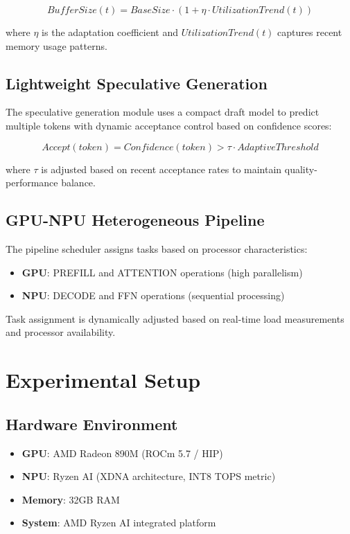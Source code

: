 \documentclass[twocolumn,10pt]{article}
\begin{document}
\begin{equation}
BufferSize(t) = BaseSize \cdot (1 + \eta \cdot UtilizationTrend(t))
\end{equation}

where $\eta$ is the adaptation coefficient and $UtilizationTrend(t)$ captures recent memory usage patterns.

\subsection{Lightweight Speculative Generation}

The speculative generation module uses a compact draft model to predict multiple tokens with dynamic acceptance control based on confidence scores:

\begin{equation}
Accept(token) = Confidence(token) > \tau \cdot AdaptiveThreshold
\end{equation}

where $\tau$ is adjusted based on recent acceptance rates to maintain quality-performance balance.

\subsection{GPU-NPU Heterogeneous Pipeline}

The pipeline scheduler assigns tasks based on processor characteristics:
\begin{itemize}
\item \textbf{GPU}: PREFILL and ATTENTION operations (high parallelism)
\item \textbf{NPU}: DECODE and FFN operations (sequential processing)
\end{itemize}

Task assignment is dynamically adjusted based on real-time load measurements and processor availability.

\section{Experimental Setup}

\subsection{Hardware Environment}
\begin{itemize}
\item \textbf{GPU}: AMD Radeon 890M (ROCm 5.7 / HIP)
\item \textbf{NPU}: Ryzen AI (XDNA architecture, INT8 TOPS metric)
\item \textbf{Memory}: 32GB RAM
\item \textbf{System}: AMD Ryzen AI integrated platform
\end{itemize}
\end{document}
